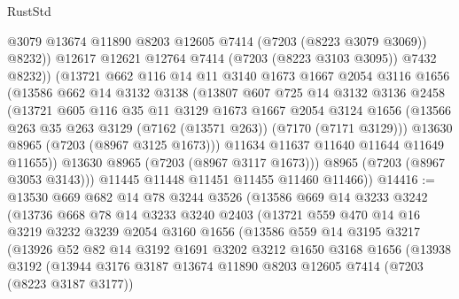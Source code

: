\begin{lexlean}{RustStd}
\begin{coremodule}
                  @3079
                  @13674
                  @11890
                  @8203
                  @12605
                  @7414
                  (@7203 (@8223 @3079 @3069))
                  @8232))
              @12617
              @12621
              @12764
              @7414
              (@7203 (@8223 @3103 @3095))
              @7432
              @8232))
          (@13721
            @662
            @116
            @14
            @11
            @3140
            @1673
            @1667
            @2054
            @3116
            @1656
            (@13586
              @662
              @14
              @3132
              @3138
              (@13807
                @607
                @725
                @14
                @3132
                @3136
                @2458
                (@13721
                  @605
                  @116
                  @35
                  @11
                  @3129
                  @1673
                  @1667
                  @2054
                  @3124
                  @1656
                  (@13566 @263 @35 @263 @3129 (@7162 (@13571 @263)) (@7170 (@7171 @3129)))
                  @13630
                  @8965
                  (@7203 (@8967 @3125 @1673)))
                @11634
                @11637
                @11640
                @11644
                @11649
                @11655))
            @13630
            @8965
            (@7203 (@8967 @3117 @1673)))
          @8965
          (@7203 (@8967 @3053 @3143)))
        @11445
        @11448
        @11451
        @11455
        @11460
        @11466))
@14416 := @13530
    @669
    @682
    @14
    @78
    @3244
    @3526
    (@13586
      @669
      @14
      @3233
      @3242
      (@13736
        @668
        @78
        @14
        @3233
        @3240
        @2403
        (@13721
          @559
          @470
          @14
          @16
          @3219
          @3232
          @3239
          @2054
          @3160
          @1656
          (@13586
            @559
            @14
            @3195
            @3217
            (@13926
              @52
              @82
              @14
              @3192
              @1691
              @3202
              @3212
              @1650
              @3168
              @1656
              (@13938
                @3192
                (@13944
                  @3176
                  @3187
                  @13674
                  @11890
                  @8203
                  @12605
                  @7414
                  (@7203 (@8223 @3187 @3177))

\end{coremodule}
\end{lexlean}
